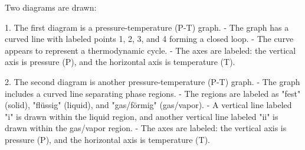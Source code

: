 Two diagrams are drawn:

1. The first diagram is a pressure-temperature (P-T) graph.  
   - The graph has a curved line with labeled points 1, 2, 3, and 4 forming a closed loop.  
   - The curve appears to represent a thermodynamic cycle.  
   - The axes are labeled: the vertical axis is pressure (P), and the horizontal axis is temperature (T).  

2. The second diagram is another pressure-temperature (P-T) graph.  
   - The graph includes a curved line separating phase regions.  
   - The regions are labeled as "fest" (solid), "flüssig" (liquid), and "gas/förmig" (gas/vapor).  
   - A vertical line labeled "i" is drawn within the liquid region, and another vertical line labeled "ii" is drawn within the gas/vapor region.  
   - The axes are labeled: the vertical axis is pressure (P), and the horizontal axis is temperature (T).